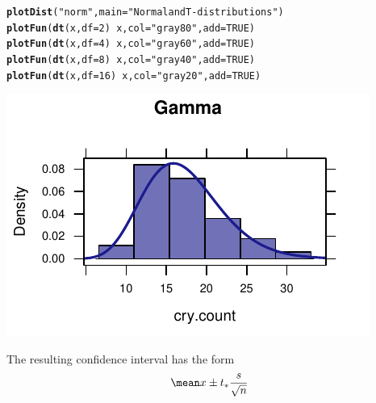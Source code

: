 \documentclass[twoside]{book}\usepackage[]{graphicx}\usepackage[]{xcolor}
\makeatletter
\def\maxwidth{ %
  \ifdim\Gin@nat@width>\linewidth
    \linewidth
  \else
    \Gin@nat@width
  \fi
}
\newcommand{\hlnum}[1]{\textcolor[rgb]{0.686,0.059,0.569}{#1}}%
\newcommand{\hlstr}[1]{\textcolor[rgb]{0.192,0.494,0.8}{#1}}%
\newcommand{\hlopt}[1]{\textcolor[rgb]{0,0,0}{#1}}%
\newcommand{\hlstd}[1]{\textcolor[rgb]{0.345,0.345,0.345}{#1}}%
\newcommand{\hlkwc}[1]{\textcolor[rgb]{0.333,0.667,0.333}{#1}}%
\newcommand{\hlkwd}[1]{\textcolor[rgb]{0.737,0.353,0.396}{\textbf{#1}}}%
\newenvironment{kframe}{%
 \def\at@end@of@kframe{}%
 \ifinner\ifhmode%
  \def\at@end@of@kframe{\end{minipage}}%
  \begin{minipage}{\columnwidth}%
 \fi\fi%
 \def\FrameCommand##1{\hskip\@totalleftmargin \hskip-\fboxsep
 \colorbox{shadecolor}{##1}\hskip-\fboxsep
     \hskip-\linewidth \hskip-\@totalleftmargin \hskip\columnwidth}%
 \MakeFramed {\advance\hsize-\width
   \@totalleftmargin\z@ \linewidth\hsize
   \@setminipage}}%
 {\par\unskip\endMakeFramed%
 \at@end@of@kframe}
\newenvironment{knitrout}{}{} %
\makeatother
\begin{document}
\begin{knitrout}
\color{fgcolor}\begin{kframe}
\begin{alltt}
\hlkwd{plotDist}\hlstd{(}\hlstr{"norm"}\hlstd{,} \hlkwc{main} \hlstd{=} \hlstr{"Normal and T-distributions"}\hlstd{)}
\hlkwd{plotFun}\hlstd{(}\hlkwd{dt}\hlstd{(x,} \hlkwc{df} \hlstd{=} \hlnum{2}\hlstd{)} \hlopt{~} \hlstd{x,} \hlkwc{col} \hlstd{=} \hlstr{"gray80"}\hlstd{,} \hlkwc{add} \hlstd{=} \hlnum{TRUE}\hlstd{)}
\hlkwd{plotFun}\hlstd{(}\hlkwd{dt}\hlstd{(x,} \hlkwc{df} \hlstd{=} \hlnum{4}\hlstd{)} \hlopt{~} \hlstd{x,} \hlkwc{col} \hlstd{=} \hlstr{"gray60"}\hlstd{,} \hlkwc{add} \hlstd{=} \hlnum{TRUE}\hlstd{)}
\hlkwd{plotFun}\hlstd{(}\hlkwd{dt}\hlstd{(x,} \hlkwc{df} \hlstd{=} \hlnum{8}\hlstd{)} \hlopt{~} \hlstd{x,} \hlkwc{col} \hlstd{=} \hlstr{"gray40"}\hlstd{,} \hlkwc{add} \hlstd{=} \hlnum{TRUE}\hlstd{)}
\hlkwd{plotFun}\hlstd{(}\hlkwd{dt}\hlstd{(x,} \hlkwc{df} \hlstd{=} \hlnum{16}\hlstd{)} \hlopt{~} \hlstd{x,} \hlkwc{col} \hlstd{=} \hlstr{"gray20"}\hlstd{,} \hlkwc{add} \hlstd{=} \hlnum{TRUE}\hlstd{)}
\end{alltt}
\end{kframe}

{\centering \includegraphics[width=\maxwidth]{figures/fig-unnamed-chunk-120-1} 

}



\end{knitrout}

The resulting confidence interval has the form
\[
\mean x \pm t_* \frac{s}{\sqrt{n}}
\]


\end{document}
